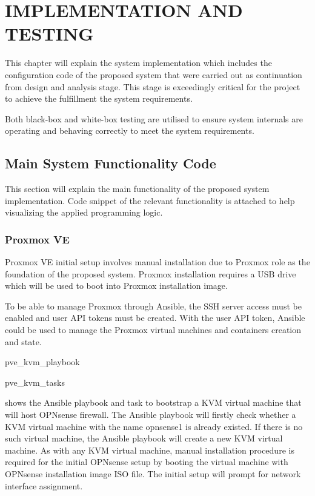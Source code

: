 \documentclass[../index.tex]{subfiles}
\begin{document}
\chapter{IMPLEMENTATION AND TESTING}

This chapter will explain the system implementation which includes the configuration code of the
proposed system that were carried out as continuation from design and analysis stage. This stage is
exceedingly critical for the project to achieve the fulfillment the system requirements. 

Both black-box and white-box testing are utilised to ensure system internals are operating and
behaving correctly to meet the system requirements.

\section{Main System Functionality Code}

This section will explain the main functionality of the proposed system implementation. Code snippet
of the relevant functionality is attached to help visualizing the applied programming logic.

\subsection{Proxmox VE}

Proxmox VE initial setup involves manual installation due to Proxmox role as the foundation of the
proposed system. Proxmox installation requires a USB drive which will be used to boot into Proxmox
installation image.

To be able to manage Proxmox through Ansible, the SSH server access must be enabled and user API
tokens must be created. With the user API token, Ansible could be used to manage the Proxmox virtual
machines and containers creation and state.

{pve_kvm_playbook}

{pve_kvm_tasks}

 shows the Ansible playbook and task to bootstrap a KVM
virtual machine that will host OPNsense firewall. The Ansible playbook will firstly check whether a
KVM virtual machine with the name opnsense1 is already existed. If there is no such virtual machine,
the Ansible playbook will create a new KVM virtual machine. As with any KVM virtual machine, manual
installation procedure is required for the initial OPNsense setup by booting the virtual machine
with OPNsense installation image ISO file. The initial setup will prompt for network interface
assignment.
\end{document}
